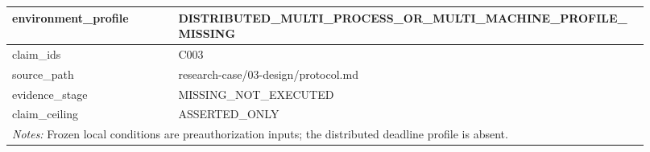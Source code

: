 \begin{longtable}{|p{0.24\linewidth}|p{0.68\linewidth}|}
environment\_\allowbreak{}profile & DISTRIBUTED\_\allowbreak{}MULTI\_\allowbreak{}PROCESS\_\allowbreak{}OR\_\allowbreak{}MULTI\_\allowbreak{}MACHINE\_\allowbreak{}PROFILE\_\allowbreak{}MISSING \\ \hline
claim\_\allowbreak{}ids & C003 \\ \hline
source\_\allowbreak{}path & research-case/03-design/protocol.md \\ \hline
evidence\_\allowbreak{}stage & MISSING\_\allowbreak{}NOT\_\allowbreak{}EXECUTED \\ \hline
claim\_\allowbreak{}ceiling & ASSERTED\_\allowbreak{}ONLY \\ \hline
\multicolumn{2}{|p{0.92\linewidth}|}{\textit{Notes:} Frozen local conditions are preauthorization inputs; the distributed deadline profile is absent.} \\ \hline
\end{longtable}
\endgroup

